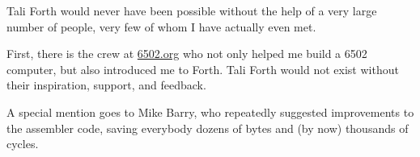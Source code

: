 Tali Forth would never have been possible without the help of a very large
number of people, very few of whom I have actually even met.

First, there is the crew at \href{http://6502.org}{6502.org} who
not only helped me build a 6502 computer, but also introduced me to Forth. Tali
Forth would not exist without their inspiration, support, and feedback.

A special mention goes to Mike Barry, who repeatedly
suggested improvements to the assembler code, saving everybody dozens of bytes
and (by now) thousands of cycles.

